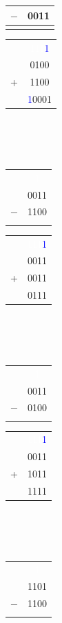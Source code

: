 \documentclass[10pt,a4paper]{article}
\begin{document}
\begin{itemize}
\begin{tabular}{cc}
$-$ & 0011\\
\hline
 & 
\end{tabular}\hspace{.5cm}
\begin{tabular}{cc}
  & \textcolor{white}{111}\textcolor{blue}{1}\\
  & 0100\\
+ & 1100\\
\hline
 & \textcolor{blue}{1}0001
\end{tabular}\\~\\~\\
\begin{tabular}{cc}
  & \textcolor{white}{1}\\
  & 0011\\
$-$ & 1100\\
\hline
 & 
\end{tabular}\hspace{.5cm}
\begin{tabular}{cc}
  & \textcolor{white}{111}\textcolor{blue}{1}\\
  & 0011\\
+ & 0011\\
\hline
 & 0111
\end{tabular}\\~\\~\\\begin{tabular}{cc}
  & \textcolor{white}{1}\\
  & 0011\\
$-$ & 0100\\
\hline
 & 
\end{tabular}\hspace{.5cm}
\begin{tabular}{cc}
  & \textcolor{white}{111}\textcolor{blue}{1}\\
  & 0011\\
+ & 1011\\
\hline
 & 1111
\end{tabular}\\~\\~\\\begin{tabular}{cc}
  & \textcolor{white}{1}\\
  & 1101\\
$-$ & 1100\\
\hline
 & 
\end{tabular}\hspace{.5cm}
\begin{tabular}{cc}

\end{tabular}
\end{itemize}
\end{document}
